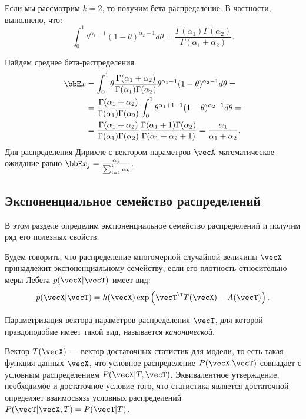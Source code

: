 Если мы рассмотрим $k = 2$, то получим бета-распределение.
В частности, выполнено, что:
\[
\int_0^1 \theta^{\alpha_1 - 1} (1 - \theta)^{\alpha_2 - 1} d\theta =  \frac{\Gamma(\alpha_1) \Gamma(\alpha_2)}{\Gamma(\alpha_1 + \alpha_2)}.
\]

\begin{example}
Найдем среднее бета-распределения.
\begin{align*}
\bbE x &= \int_0^1 \theta \frac{\Gamma(\alpha_1 + \alpha_2)}{\Gamma(\alpha_1) \Gamma(\alpha_2)} \theta^{\alpha_1 - 1} (1 - \theta)^{\alpha_2 - 1}d\theta = \\
&= \frac{\Gamma(\alpha_1 + \alpha_2)}{\Gamma(\alpha_1) \Gamma(\alpha_2)} \int_0^1 \theta^{\alpha_1 + 1 - 1} (1 - \theta)^{\alpha_2 - 1}d\theta = \\
&= \frac{\Gamma(\alpha_1 + \alpha_2)}{\Gamma(\alpha_1) \Gamma(\alpha_2)} 
   \frac{\Gamma(\alpha_1 + 1) \Gamma(\alpha_2)}{\Gamma(\alpha_1 + \alpha_2 + 1)} = \frac{\alpha_1}{\alpha_1 + \alpha_2}.
\end{align*}
Для распределения Дирихле с вектором параметров $\vecA$ математическое ожидание равно $\bbE x_j = \frac{\alpha_j}{\sum_{i = 1}^k \alpha_k}$.

\end{example}

\subsection{Экспоненциальное семейство распределений}
\label{sec:exp_family}

В этом разделе определим экспоненциальное семейство распределений и получим ряд его полезных свойств.
\begin{Definition}
Будем говорить, что распределение многомерной случайной величины $\vecX$ принадлежит экспоненциальному семейству, если
его плотность относительно меры Лебега $p(\vecX | \vecT)$ имеет вид:
\[
p(\vecX | \vecT) = h(\vecX) \exp \left(\vecT^\T T(\vecX) - A(\vecT) \right).
\]
\end{Definition}

Параметризация вектора параметров распределения $\vecT$, для которой правдоподобие имеет такой вид, называется \emph{канонической}. 

Вектор $T(\vecX)$ --- вектор достаточных статистик для модели, то есть такая функция данных $\vecX$, что
условное распределение $P(\vecX | \vecT)$ совпадает с условным распределением $P(\vecX | T, \vecT)$.
Эквивалентное утверждение, необходимое и достаточное условие того, что статистика является достаточной определяет взаимосвязь условных распределений $P(\vecT | \vecX, T) = P(\vecT | T)$.

